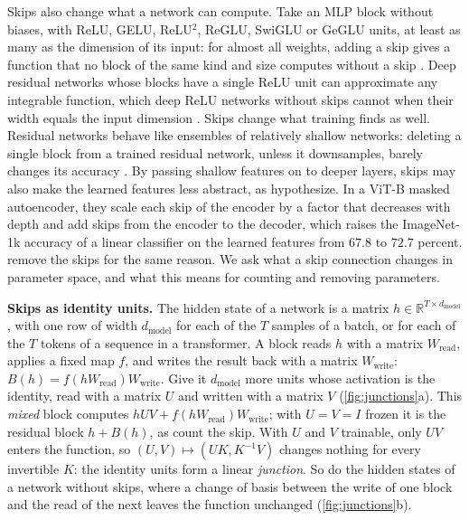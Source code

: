 \documentclass[10pt]{article}
\theoremstyle{definition}
\theoremstyle{remark}
\newcommand{\R}{\mathbb{R}}
\newcommand{\Wread}{W_{\mathrm{read}}}
\newcommand{\Wwrite}{W_{\mathrm{write}}}
\newcommand{\dm}{d_{\mathrm{model}}}
\newcommand{\para}[1]{\smallskip\noindent\textbf{#1}\hspace{0.5em}}
\begin{document}
Skips also change what a network can compute. Take an MLP block without biases, with ReLU, GELU, ReLU$^2$, ReGLU, SwiGLU or GeGLU units, at least as many as the dimension of its input: for almost all weights, adding a skip gives a function that no block of the same kind and size computes without a skip \citep{mijoski2026absorb}. Deep residual networks whose blocks have a single ReLU unit can approximate any integrable function, which deep ReLU networks without skips cannot when their width equals the input dimension \citep{lin2018resnet}. Skips change what training finds as well. Residual networks behave like ensembles of relatively shallow networks: deleting a single block from a trained residual network, unless it downsamples, barely changes its accuracy \citep{veit2016ensembles}. By passing shallow features on to deeper layers, skips may also make the learned features less abstract, as \citet{zhang2026residual} hypothesize. In a ViT-B masked autoencoder, they scale each skip of the encoder by a factor that decreases with depth and add skips from the encoder to the decoder, which raises the ImageNet-1k accuracy of a linear classifier on the learned features from $67.8$ to $72.7$ percent. \citet{ji2026cutting} remove the skips for the same reason. We ask what a skip connection changes in parameter space, and what this means for counting and removing parameters.

\para{Skips as identity units.} The hidden state of a network is a matrix $h \in \R^{T\times\dm}$, with one row of width $\dm$ for each of the $T$ samples of a batch, or for each of the $T$ tokens of a sequence in a transformer. A block reads $h$ with a matrix $\Wread$, applies a fixed map $f$, and writes the result back with a matrix $\Wwrite$: $B(h) = f(h\Wread)\Wwrite$. Give it $\dm$ more units whose activation is the identity, read with a matrix $U$ and written with a matrix $V$ (\cref{fig:junctions}a). This \emph{mixed} block computes $hUV + f(h\Wread)\Wwrite$; with $U = V = I$ frozen it is the residual block $h + B(h)$, as \citet{lin2018resnet} count the skip. With $U$ and $V$ trainable, only $UV$ enters the function, so $(U, V) \mapsto (UK, K^{-1}V)$ changes nothing for every invertible $K$: the identity units form a linear \emph{junction}. So do the hidden states of a network without skips, where a change of basis between the write of one block and the read of the next leaves the function unchanged (\cref{fig:junctions}b).
\end{document}
